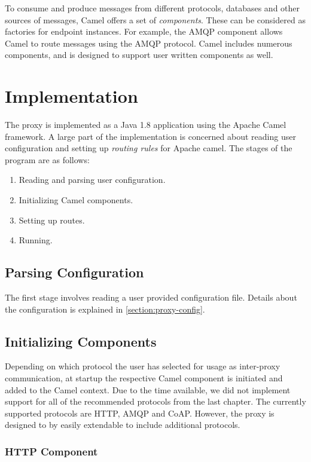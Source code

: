To consume and produce messages from different protocols, databases and other
sources of messages, Camel offers a set of \textit{components}. These
can be considered as factories for endpoint instances. For example, the AMQP
component allows Camel to route messages using the AMQP protocol. Camel includes
numerous components, and is designed to support user written components as well.


\section{Implementation}

The proxy is implemented as a Java 1.8 application using the Apache Camel
framework. A large part of the implementation is concerned about reading user
configuration and setting up \textit{routing rules} for Apache camel. The stages
of the program are as follows:

\begin{enumerate}
    \item Reading and parsing user configuration.
    \item Initializing Camel components.
    \item Setting up routes.
    \item Running.
\end{enumerate}

\subsection{Parsing Configuration}

The first stage involves reading a user provided configuration file. Details
about the configuration is explained in \cref{section:proxy-config}.

\subsection{Initializing Components}

Depending on which protocol the user has selected for usage as inter-proxy
communication, at startup the respective Camel component is initiated and added
to the Camel context. Due to the time available, we did not implement support for all of the
recommended protocols from the last chapter. The currently supported protocols
are HTTP, AMQP and CoAP. However, the proxy is designed to by easily extendable to
include additional protocols.

\subsubsection{HTTP Component}

